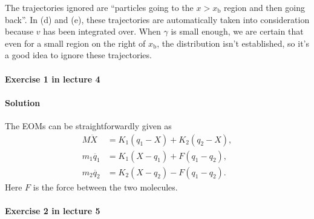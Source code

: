 \documentclass[hyperref, a4paper]{article}
\begin{document}
\begin{itemize}
The trajectories ignored are ``particles going to the $x > x_{\text{b}}$ region and then going back''.
In (d) and (e), these trajectories are automatically taken into consideration 
because $v$ has been integrated over.
When $\gamma$ is small enough, we are certain that even for a small region on the right of $x_{\text{b}}$,
the distribution isn't established,
so it's a good idea to ignore these trajectories.

\end{itemize}

\paragraph{Exercise 1 in lecture 4} 

\paragraph{Solution} The EOMs can be straightforwardly given as  
\begin{equation}
    \begin{aligned}
        M   \ddot{X}   &= K_1 (q_1 - X) + K_2 (q_2 - X), \\
        m_1 \ddot{q_1} &= K_1 (X - q_1) + F(q_1 - q_2), \\
        m_2 \ddot{q_2} &= K_2 (X - q_2) - F(q_1 - q_2). 
    \end{aligned}
\end{equation}
Here $F$ is the force between the two molecules.

\paragraph{Exercise 2 in lecture 5}
\end{document}
